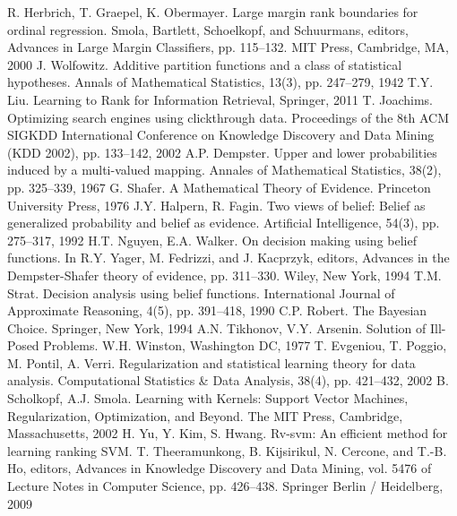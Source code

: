 \documentclass[12pt,a4paper,oneside]{article}
\begin{document}
\begin{thebibliography}{9}
	 R. Herbrich, T. Graepel, K. Obermayer. Large margin rank boundaries for ordinal regression. Smola, Bartlett, Schoelkopf, and Schuurmans, editors, Advances in Large Margin Classifiers, pp. 115–132. MIT Press, Cambridge, MA, 2000%
	 J. Wolfowitz. Additive partition functions and a class of statistical hypotheses. Annals of Mathematical Statistics, 13(3), pp. 247–279, 1942%
	 T.Y. Liu. Learning to Rank for Information Retrieval, Springer, 2011%
	 T. Joachims. Optimizing search engines using clickthrough data. Proceedings of the 8th ACM SIGKDD International Conference on Knowledge Discovery and Data Mining (KDD 2002), pp. 133–142, 2002%
	 A.P. Dempster. Upper and lower probabilities induced by a multi-valued mapping. Annales of Mathematical Statistics, 38(2), pp. 325–339, 1967%
	 G. Shafer. A Mathematical Theory of Evidence. Princeton University Press, 1976%
	 J.Y. Halpern, R. Fagin. Two views of belief: Belief as generalized probability and belief as evidence. Artificial Intelligence, 54(3), pp. 275–317, 1992%
	 H.T. Nguyen,  E.A. Walker. On decision making using belief functions. In R.Y. Yager, M. Fedrizzi, and J. Kacprzyk, editors, Advances in the Dempster-Shafer theory of evidence, pp. 311–330. Wiley, New York, 1994%
	 T.M. Strat. Decision analysis using belief functions. International Journal of Approximate Reasoning, 4(5), pp. 391–418, 1990%
	 C.P. Robert. The Bayesian Choice. Springer, New York, 1994%
	 A.N. Tikhonov, V.Y. Arsenin. Solution of Ill-Posed Problems. W.H. Winston, Washington DC, 1977%
	 T. Evgeniou, T. Poggio, M. Pontil, A. Verri. Regularization and statistical learning theory for data analysis. Computational Statistics \& Data Analysis, 38(4), pp. 421–432, 2002%
	 B. Scholkopf, A.J. Smola. Learning with Kernels: Support Vector Machines, Regularization, Optimization, and Beyond. The MIT Press, Cambridge, Massachusetts, 2002%
	 H. Yu, Y. Kim, S. Hwang. Rv-svm: An efficient method for learning ranking SVM. T. Theeramunkong, B. Kijsirikul, N. Cercone, and T.-B. Ho, editors, Advances in Knowledge Discovery and Data Mining, vol. 5476 of Lecture Notes in Computer Science, pp. 426–438. Springer Berlin / Heidelberg, 2009%
\end{thebibliography}
\end{document}
